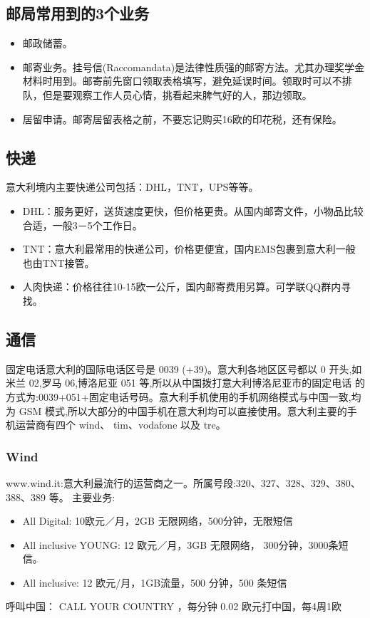 \subsection{邮局常用到的3个业务}
\begin{itemize}
\item 邮政储蓄。
\item 邮寄业务。挂号信(Raccomandata)是法律性质强的邮寄方法。尤其办理奖学金材料时用到。邮寄前先窗口领取表格填写，避免延误时间。领取时可以不排队，但是要观察工作人员心情，挑看起来脾气好的人，那边领取。
\item 居留申请。邮寄居留表格之前，不要忘记购买16欧的印花税，还有保险。
\end{itemize}

\subsection{快递}
意大利境内主要快递公司包括：DHL，TNT，UPS等等。
\begin{itemize}
\item DHL：服务更好，送货速度更快，但价格更贵。从国内邮寄文件，小物品比较合适，一般3－5个工作日。
\item TNT：意大利最常用的快递公司，价格更便宜，国内EMS包裹到意大利一般也由TNT接管。
\item 人肉快递：价格往往10-15欧一公斤，国内邮寄费用另算。可学联QQ群内寻找。
\end{itemize}

\subsection{通信}
固定电话意大利的国际电话区号是 0039 (+39)。意大利各地区区号都以 0 开头,如米兰 02,罗马 06,博洛尼亚 051 等,所以从中国拨打意大利博洛尼亚市的固定电话 的方式为:0039+051+固定电话号码。意大利手机使用的手机网络模式与中国一致,均为 GSM 模式,所以大部分的中国手机在意大利均可以直接使用。意大利主要的手机运营商有四个 wind、 tim、vodafone 以及 tre。 

\subsubsection{Wind}
www.wind.it:意大利最流行的运营商之一。所属号段:320、327、328、329、380、 388、389 等。
主要业务:
\begin{itemize}
\item All Digital: 10欧元／月，2GB 无限网络，500分钟，无限短信
\item All inclusive YOUNG:  12 欧元／月，3GB 无限网络， 300分钟，3000条短信。
\item All inclusive:  12 欧元/月，1GB流量，500 分钟，500 条短信
\end{itemize}
呼叫中国： CALL YOUR COUNTRY ，每分钟 0.02 欧元打中国，每4周1欧

